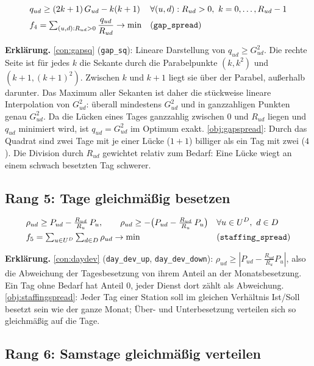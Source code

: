 \documentclass[11pt]{combiArticle}
\newcommand{\code}[1]{\texttt{#1}}
\begin{document}
\begin{align}
  & q_{ud} \ge (2k+1)\, G_{ud} - k(k+1) && \forall (u,d) : R_{ud} > 0,\ k = 0,\dots,R_{ud}-1 \label{con:gapsq}\\
  & f_4 = \textstyle\sum_{(u,d) : R_{ud} > 0} \dfrac{q_{ud}}{R_{ud}} \to \min && \text{(\code{gap\_spread})} \label{obj:gapspread}
\end{align}

\textbf{Erklärung.}
\eqref{con:gapsq} (\code{gap\_sq}): Lineare Darstellung von $q_{ud} \ge G_{ud}^2$. Die rechte Seite ist für
jedes $k$ die Sekante durch die Parabelpunkte $(k, k^2)$ und $(k+1, (k+1)^2)$. Zwischen $k$ und $k+1$ liegt sie
über der Parabel, außerhalb darunter. Das Maximum aller Sekanten ist daher die stückweise lineare Interpolation
von $G_{ud}^2$: überall mindestens $G_{ud}^2$ und in ganzzahligen Punkten genau $G_{ud}^2$. Da die Lücken eines
Tages ganzzahlig zwischen $0$ und $R_{ud}$ liegen und $q_{ud}$ minimiert wird, ist $q_{ud} = G_{ud}^2$ im
Optimum exakt.
\eqref{obj:gapspread}: Durch das Quadrat sind zwei Tage mit je einer Lücke ($1+1$) billiger als ein Tag mit zwei
($4$). Die Division durch $R_{ud}$ gewichtet relativ zum Bedarf: Eine Lücke wiegt an einem schwach besetzten Tag
schwerer.

\subsection{Rang 5: Tage gleichmäßig besetzen}\label{sec:z:tage}

\begin{align}
  & \rho_{ud} \ge P_{ud} - \tfrac{R_{ud}}{R_u}\, P_u,\qquad
    \rho_{ud} \ge -\bigl(P_{ud} - \tfrac{R_{ud}}{R_u}\, P_u\bigr) && \forall u \in U^{D},\ d \in D \label{con:daydev}\\
  & f_5 = \textstyle\sum_{u \in U^{D}} \sum_{d \in D} \rho_{ud} \to \min && \text{(\code{staffing\_spread})} \label{obj:staffingspread}
\end{align}

\textbf{Erklärung.}
\eqref{con:daydev} (\code{day\_dev\_up}, \code{day\_dev\_down}): $\rho_{ud} \ge |P_{ud} - \frac{R_{ud}}{R_u}
P_u|$, also die Abweichung der Tagesbesetzung von ihrem Anteil an der Monatsbesetzung. Ein Tag ohne Bedarf
hat Anteil 0, jeder Dienst dort zählt als Abweichung.
\eqref{obj:staffingspread}: Jeder Tag einer Station soll im gleichen Verhältnis Ist/Soll besetzt sein wie der
ganze Monat; Über- und Unterbesetzung verteilen sich so gleichmäßig auf die Tage.

\subsection{Rang 6: Samstage gleichmäßig verteilen}\label{sec:z:samstage}
\end{document}

